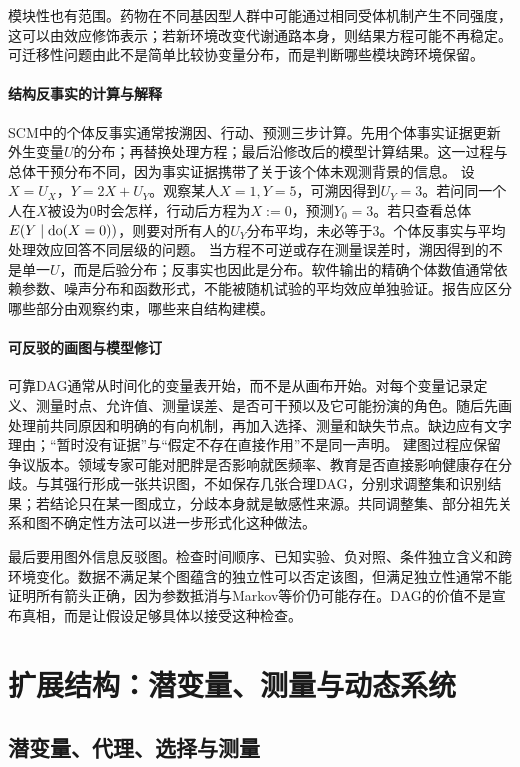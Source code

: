 模块性也有范围。药物在不同基因型人群中可能通过相同受体机制产生不同强度，这可以由效应修饰表示；若新环境改变代谢通路本身，则结果方程可能不再稳定。可迁移性问题由此不是简单比较协变量分布，而是判断哪些模块跨环境保留。

\paragraph{结构反事实的计算与解释}

SCM中的个体反事实通常按溯因、行动、预测三步计算。先用个体事实证据更新外生变量$U$的分布；再替换处理方程；最后沿修改后的模型计算结果。这一过程与总体干预分布不同，因为事实证据携带了关于该个体未观测背景的信息。
设 $X=U_X$，$Y=2X+U_Y$。观察某人$X=1,Y=5$，可溯因得到$U_Y=3$。若问同一个人在$X$被设为0时会怎样，行动后方程为$X:=0$，预测$Y_0=3$。若只查看总体$E(Y\mid\operatorname{do}(X=0))$，则要对所有人的$U_Y$分布平均，未必等于3。个体反事实与平均处理效应回答不同层级的问题。
当方程不可逆或存在测量误差时，溯因得到的不是单一$U$，而是后验分布；反事实也因此是分布。软件输出的精确个体数值通常依赖参数、噪声分布和函数形式，不能被随机试验的平均效应单独验证。报告应区分哪些部分由观察约束，哪些来自结构建模。

\paragraph{可反驳的画图与模型修订}

可靠DAG通常从时间化的变量表开始，而不是从画布开始。对每个变量记录定义、测量时点、允许值、测量误差、是否可干预以及它可能扮演的角色。随后先画处理前共同原因和明确的有向机制，再加入选择、测量和缺失节点。缺边应有文字理由；“暂时没有证据”与“假定不存在直接作用”不是同一声明。
建图过程应保留争议版本。领域专家可能对肥胖是否影响就医频率、教育是否直接影响健康存在分歧。与其强行形成一张共识图，不如保存几张合理DAG，分别求调整集和识别结果；若结论只在某一图成立，分歧本身就是敏感性来源。共同调整集、部分祖先关系和图不确定性方法可以进一步形式化这种做法。

最后要用图外信息反驳图。检查时间顺序、已知实验、负对照、条件独立含义和跨环境变化。数据不满足某个图蕴含的独立性可以否定该图，但满足独立性通常不能证明所有箭头正确，因为参数抵消与Markov等价仍可能存在。DAG的价值不是宣布真相，而是让假设足够具体以接受这种检查。

\section{扩展结构：潜变量、测量与动态系统}

\subsection{潜变量、代理、选择与测量}

